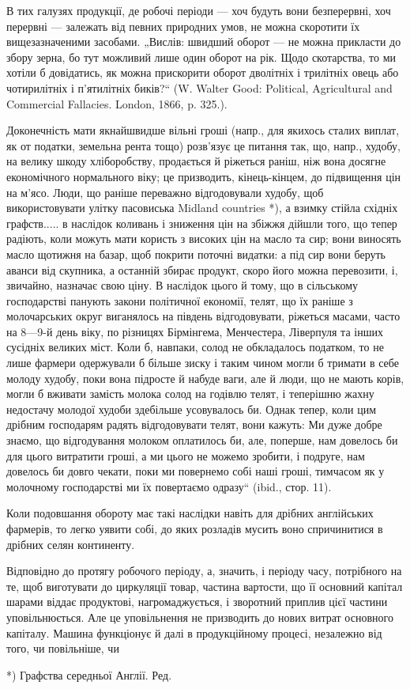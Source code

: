 В тих галузях продукції, де робочі періоди — хоч будуть вони безперервні,
хоч перервні — залежать від певних природних умов, не можна
скоротити їх вищезазначеними засобами. „Вислів: швидший оборот — не
можна прикласти до збору зерна, бо тут можливий лише один оборот
на рік. Щодо скотарства, то ми хотіли б довідатись, як можна прискорити
оборот дволітніх і трилітніх овець або чотирилітніх і п’ятилітніх
биків?“ (W. Walter Good: Political, Agricultural and Commercial Fallacies.
London, 1866, p. 325.).

Доконечність мати якнайшвидше вільні гроші (напр., для якихось сталих
виплат, як от податки, земельна рента тощо) розв’язує це питання
так, що, напр., худобу, на велику шкоду хліборобству, продається й
ріжеться раніш, ніж вона досягне економічного нормального віку; це
призводить, кінець-кінцем, до підвищення цін на м’ясо. Люди, що раніше
переважно відгодовували худобу, щоб використовувати улітку пасовиська
Midland countries *), а взимку стійла східніх графств..... в наслідок коливань
і зниження цін на збіжжя дійшли того, що тепер радіють, коли
можуть мати користь з високих цін на масло та сир; вони виносять масло
щотижня на базар, щоб покрити поточні видатки: а під сир вони беруть
аванси від скупника, а останній збирає продукт, скоро його можна перевозити,
і, звичайно, назначає свою ціну. В наслідок цього й тому, що
в сільському господарстві панують закони політичної економії, телят, що
їх раніше з молочарських округ виганялось на південь відгодовувати,
ріжеться масами, часто на 8—9-й день віку, по різницях Бірмінгема, Менчестера,
Ліверпуля та інших сусідніх великих міст. Коли б, навпаки,
солод не обкладалось податком, то не лише фармери одержували б більше
зиску і таким чином могли б тримати в себе молоду худобу, поки вона
підросте й набуде ваги, але й люди, що не мають корів, могли б вживати
замість молока солод на годівлю телят, і теперішню жахну недостачу
молодої худоби здебільше усовувалось би. Однак тепер, коли цим
дрібним господарям радять відгодовувати телят, вони кажуть: Ми дуже
добре знаємо, що відгодування молоком оплатилось би, але, поперше,
нам довелось би для цього витратити гроші, а ми цього не можемо зробити,
і подруге, нам довелось би довго чекати, поки ми повернемо собі
наші гроші, тимчасом як у молочному господарстві ми їх повертаємо
одразу“ (ibid., стор. 11).

Коли подовшання обороту має такі наслідки навіть для дрібних англійських
фармерів, то легко уявити собі, до яких розладів мусить воно
спричинитися в дрібних селян континенту.

Відповідно до протягу робочого періоду, а, значить, і періоду часу,
потрібного на те, щоб виготувати до циркуляції товар, частина вартости,
що її основний капітал шарами віддає продуктові, нагромаджується, і
зворотний приплив цієї частини уповільнюється. Але це уповільнення не
призводить до нових витрат основного капіталу. Машина функціонує й
далі в продукційному процесі, незалежно від того, чи повільніше, чи

*) Графства середньої Англії. Ред.
